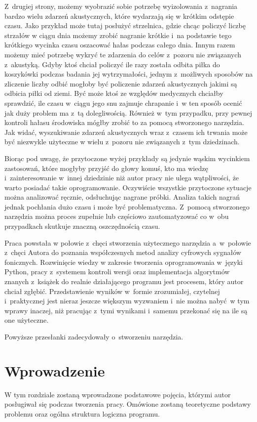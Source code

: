 \documentclass[eng,printmode]{mgr}
\begin{document}
Z~drugiej strony, możemy wyobrazić sobie potrzebę wyizolowania z~nagrania bardzo wielu zdarzeń akustycznych, które wydarzają się w krótkim odstępie czasu. Jako przykład może tutaj posłużyć strzelnica, gdzie chcąc policzyć liczbę strzałów w ciągu dnia możemy zrobić nagranie krótkie i~na podstawie tego krótkiego wycinka czasu oszacować hałas podczas całego dnia. Innym razem możemy mieć potrzebę wykryć te zdarzenia do celów z~pozoru nie związanych z~akustyką. Gdyby ktoś chciał policzyć ile razy została odbita piłka do koszykówki podczas badania jej wytrzymałości, jednym z~możliwych sposobów na zliczenie liczby odbić mogłoby być policzenie zdarzeń akustycznych jakimi są odbicia piłki od ziemi. Być może ktoś ze względów medycznych chciałby sprawdzić, ile czasu w~ciągu jego snu zajmuje chrapanie i~w ten sposób ocenić jak duży problem ma z~tą dolegliwością. Również w~tym przypadku, przy pewnej kontroli hałasu środowiska mógłby zrobić to za pomocą stworzonego narzędzia. Jak widać, wyszukiwanie zdarzeń akustycznych wraz z~czasem ich trwania może być niezwykle użyteczne w wielu z~pozoru nie związanych z~tym dziedzinach. 

Biorąc pod uwagę, że przytoczone wyżej przykłady są jedynie wąskim wycinkiem zastosowań, które mogłyby przyjść do głowy komuś, kto ma wiedzę i~zainteresowanie w~innej dziedzinie niż autor pracy nie ulega wątpliwości, że warto posiadać takie oprogramowanie. Oczywiście wszystkie przytoczone sytuacje można analizować ręcznie, odsłuchując nagrane próbki. Analiza takich nagrań jednak pochłania dużo czasu i może być problematyczna. Z~pomocą stworzonego narzędzia można proces zupełnie lub częściowo zautomatyzować co w~obu przypadkach skutkuje znaczną oszczędnością czasu. 

Praca powstała w połowie z~chęci stworzenia użytecznego narzędzia a~w~połowie z~chęci Autora do poznania współczesnych metod analizy cyfrowych sygnałów fonicznych. Rozwinięcie wiedzy w zakresie tworzenia oprogramowania w~języki Python, pracy z~systemem kontroli wersji oraz implementacja algorytmów znanych z~książek do realnie działającego programu jest procesem, który autor chciał zgłębić. Przedstawienie wyników w~formie zrozumiałej, czytelnej i~praktycznej jest nieraz jeszcze większym wyzwaniem i~nie można nabyć~w tym wprawy inaczej, niż pracując z~tymi wynikami i~samemu przekonać się na ile są one użyteczne.

Powyższe przesłanki zadecydowały o~stworzeniu narzędzia. 

\chapter{Wprowadzenie}
W tym rozdziale zostaną wprowadzone podstawowe pojęcia, którymi autor posługiwał się podczas tworzenia pracy. Omówione zostaną teoretyczne podstawy problemu oraz ogólna struktura logiczna programu.
\end{document}
